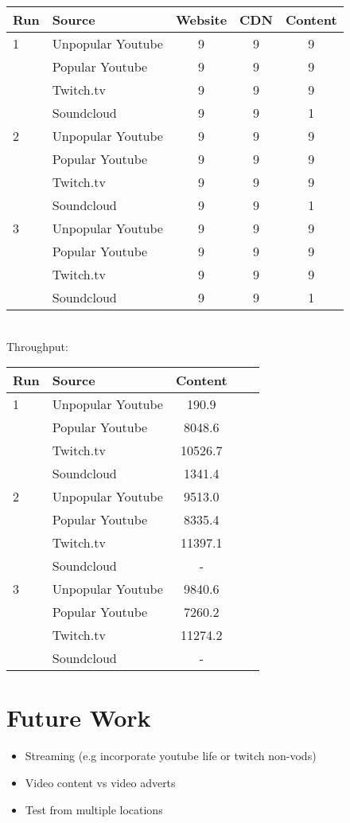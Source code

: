 \documentclass{sig-alternate-05-2015}
\begin{document}
\begin{tabular}{|l|l|c|c|c|} \hline
Run & Source & Website & CDN & Content \\ \hline
1 & Unpopular Youtube & 9 & 9 & 9 \\ \hline
  & Popular Youtube   & 9 & 9 & 9 \\ \hline
  & Twitch.tv         & 9 & 9 & 9 \\ \hline
  & Soundcloud        & 9 & 9 & 1 \\ \hline
2 & Unpopular Youtube & 9 & 9 & 9 \\ \hline
  & Popular Youtube   & 9 & 9 & 9 \\ \hline
  & Twitch.tv         & 9 & 9 & 9 \\ \hline
  & Soundcloud        & 9 & 9 & 1 \\ \hline
3 & Unpopular Youtube & 9 & 9 & 9 \\ \hline
  & Popular Youtube   & 9 & 9 & 9 \\ \hline
  & Twitch.tv         & 9 & 9 & 9 \\ \hline
  & Soundcloud        & 9 & 9 & 1 \\ \hline
\end{tabular}
\vspace{1em} \\
Throughput: \\
\begin{tabular}{|l|l|c|c|c|} \hline
Run & Source & Content \\ \hline
1 & Unpopular Youtube & 190.9   \\ \hline
  & Popular Youtube   & 8048.6  \\ \hline
  & Twitch.tv         & 10526.7 \\ \hline
  & Soundcloud        & 1341.4  \\ \hline
2 & Unpopular Youtube & 9513.0  \\ \hline
  & Popular Youtube   & 8335.4  \\ \hline
  & Twitch.tv         & 11397.1 \\ \hline
  & Soundcloud        & -       \\ \hline
3 & Unpopular Youtube & 9840.6  \\ \hline
  & Popular Youtube   & 7260.2  \\ \hline
  & Twitch.tv         & 11274.2 \\ \hline  
  & Soundcloud        & -       \\ \hline
\end{tabular}

\section{Future Work}\label{sec:futurework}
\begin{itemize}
	\item Streaming (e.g incorporate youtube life or twitch non-vods)
	\item Video content vs video adverts
	\item Test from multiple locations
\end{itemize}

\pagebreak

\small

\end{document}
